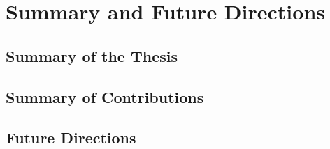 
\chapter{Summary and Future Directions}
\label{sec:summary_future_work}

\section{Summary of the Thesis}
\section{Summary of Contributions}
\section{Future Directions}


%
%
%
%
%
%
%
%
%
%
%
